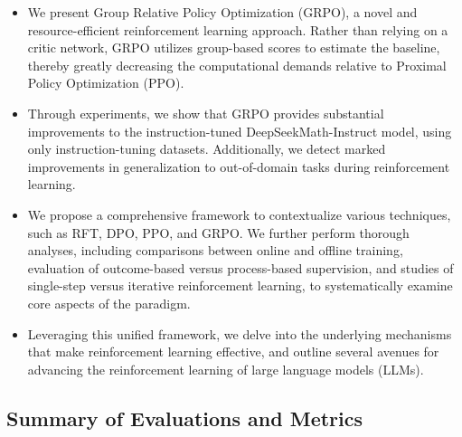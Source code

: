 \begin{itemize}[topsep=0pt]
    \item We present Group Relative Policy Optimization (GRPO), a novel and resource-efficient reinforcement learning approach. Rather than relying on a critic network, GRPO utilizes group-based scores to estimate the baseline, thereby greatly decreasing the computational demands relative to Proximal Policy Optimization (PPO).
    \item Through experiments, we show that GRPO provides substantial improvements to the instruction-tuned DeepSeekMath-Instruct model, using only instruction-tuning datasets. Additionally, we detect marked improvements in generalization to out-of-domain tasks during reinforcement learning.
    \item We propose a comprehensive framework to contextualize various techniques, such as RFT, DPO, PPO, and GRPO. We further perform thorough analyses, including comparisons between online and offline training, evaluation of outcome-based versus process-based supervision, and studies of single-step versus iterative reinforcement learning, to systematically examine core aspects of the paradigm.
    \item Leveraging this unified framework, we delve into the underlying mechanisms that make reinforcement learning effective, and outline several avenues for advancing the reinforcement learning of large language models (LLMs).
\end{itemize}

\subsection{Summary of Evaluations and Metrics}

